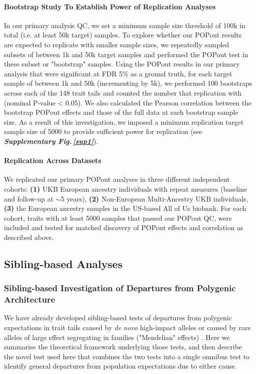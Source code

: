\documentclass[12pt]{zHenriquesLab-StyleBioRxiv}
\newcommand\sref[1]{\normalsize{\textbf{\textit{Supplementary Fig.\,\ref{#1}}}}\normalsize{}}
\begin{document}
{{\paragraph{Bootstrap Study To Establish Power of Replication Analyses}
In our primary analysis QC, we set a minimum sample size threshold of 100k in total 
(i.e. at least 50k target) samples. To explore whether our POPout results are expected 
to replicate with smaller sample sizes, we repeatedly sampled subsets of between 1k and 50k 
target samples and performed the POPout test in these subset or "bootstrap" samples. 
Using the POPout results in our primary analysis that were significant at FDR 5\% as a ground 
truth, for each target sample of between 1k and 50k (incrementing by 5k), 
we performed 100 bootstraps across each of the 148 trait tails and counted 
the number that replication with (nominal P-value < 0.05). 
We also calculated the Pearson correlation between the bootstrap 
POPout effects and those of the full data at each bootstrap sample size. As a result of 
this investigation, we imposed a minimum replication target sample size of 5000 to 
provide sufficient power for replication (see \sref{sup1}). 


\paragraph{Replication Across Datasets} 
We replicated our primary POPout analyses in three different independent cohorts:  
\textbf{(1)} UKB European ancestry individuals with repeat measures (baseline and follow-up at $\sim$5 years), 
\textbf{(2)} Non-European Multi-Ancestry UKB individuals, \textbf{(3)} the European ancestry samples in the 
US-based All of Us biobank. For each cohort, traits with at least 5000 samples that passed our POPout QC, 
were included and tested for matched discovery of POPout effects and correlation as described above. 
%
\subsection*{Sibling-based Analyses} \label{sec:methods:sibs}  
%
\subsubsection*{Sibling-based Investigation of Departures from Polygenic Architecture}
We have already developed sibling-based tests of departures from polygenic expectations 
in trait tails caused by \emph{de novo} high-impact alleles or caused by rare alleles of 
large effect segregating in families ("Mendelian" effects) \cite{Souaiaia2024}. Here we 
summarise the theoretical framework underlying those tests, and then describe the novel 
test used here that combines the two tests into a single omnibus test to identify general 
departures from population expectations due to either cause.

}}
\end{document}
